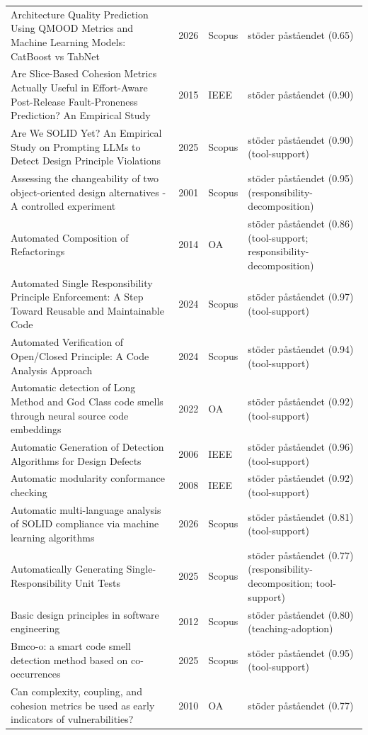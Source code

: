 \begin{longtable}{@{}%
  >{\raggedright\arraybackslash}p{}c%
  >{\raggedright\arraybackslash}p{}%
  >{\raggedright\arraybackslash}p{}@{}}
Architecture Quality Prediction Using QMOOD Metrics and Machine Learning Models: CatBoost vs TabNet & 2026 & Scopus & stöder påståendet (0.65) \\
Are Slice-Based Cohesion Metrics Actually Useful in Effort-Aware Post-Release Fault-Proneness Prediction? An Empirical Study & 2015 & IEEE & stöder påståendet (0.90) \\
Are We SOLID Yet? An Empirical Study on Prompting LLMs to Detect Design Principle Violations & 2025 & Scopus & stöder påståendet (0.90) (tool-support) \\
Assessing the changeability of two object-oriented design alternatives - A controlled experiment & 2001 & Scopus & stöder påståendet (0.95) (responsibility-decomposition) \\
Automated Composition of Refactorings & 2014 & OA & stöder påståendet (0.86) (tool-support; responsibility-decomposition) \\
Automated Single Responsibility Principle Enforcement: A Step Toward Reusable and Maintainable Code & 2024 & Scopus & stöder påståendet (0.97) (tool-support) \\
Automated Verification of Open/Closed Principle: A Code Analysis Approach & 2024 & Scopus & stöder påståendet (0.94) (tool-support) \\
Automatic detection of Long Method and God Class code smells through neural source code embeddings & 2022 & OA & stöder påståendet (0.92) (tool-support) \\
Automatic Generation of Detection Algorithms for Design Defects & 2006 & IEEE & stöder påståendet (0.96) (tool-support) \\
Automatic modularity conformance checking & 2008 & IEEE & stöder påståendet (0.92) (tool-support) \\
Automatic multi-language analysis of SOLID compliance via machine learning algorithms & 2026 & Scopus & stöder påståendet (0.81) (tool-support) \\
Automatically Generating Single-Responsibility Unit Tests & 2025 & Scopus & stöder påståendet (0.77) (responsibility-decomposition; tool-support) \\
Basic design principles in software engineering & 2012 & Scopus & stöder påståendet (0.80) (teaching-adoption) \\
Bmco-o: a smart code smell detection method based on co-occurrences & 2025 & Scopus & stöder påståendet (0.95) (tool-support) \\
Can complexity, coupling, and cohesion metrics be used as early indicators of vulnerabilities? & 2010 & OA & stöder påståendet (0.77) \\

\end{longtable}
